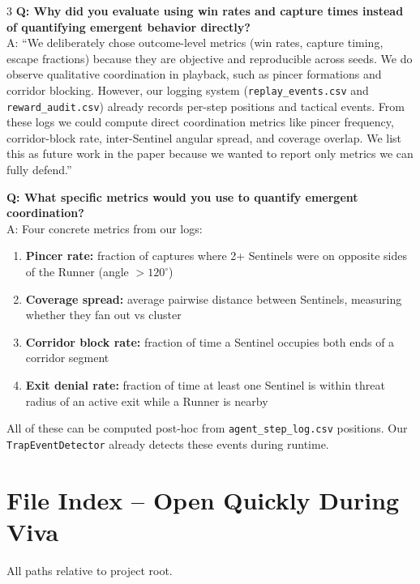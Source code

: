 \documentclass[10pt,landscape,a4paper]{article}
\begin{document}
\begin{multicols}{3}
\textbf{Q: Why did you evaluate using win rates and capture times instead of quantifying emergent behavior directly?} \\
A: ``We deliberately chose outcome-level metrics (win rates, capture timing, escape fractions) because they are objective and reproducible across seeds. We do observe qualitative coordination in playback, such as pincer formations and corridor blocking. However, our logging system (\texttt{replay\_events.csv} and \texttt{reward\_audit.csv}) already records per-step positions and tactical events. From these logs we could compute direct coordination metrics like pincer frequency, corridor-block rate, inter-Sentinel angular spread, and coverage overlap. We list this as future work in the paper because we wanted to report only metrics we can fully defend.''

\textbf{Q: What specific metrics would you use to quantify emergent coordination?} \\
A: Four concrete metrics from our logs:
\begin{enumerate}
\item \textbf{Pincer rate:} fraction of captures where 2+ Sentinels were on opposite sides of the Runner (angle $> 120^{\circ}$)
\item \textbf{Coverage spread:} average pairwise distance between Sentinels, measuring whether they fan out vs cluster
\item \textbf{Corridor block rate:} fraction of time a Sentinel occupies both ends of a corridor segment
\item \textbf{Exit denial rate:} fraction of time at least one Sentinel is within threat radius of an active exit while a Runner is nearby
\end{enumerate}
All of these can be computed post-hoc from \texttt{agent\_step\_log.csv} positions. Our \texttt{TrapEventDetector} already detects these events during runtime.

\section{File Index -- Open Quickly During Viva}

{\scriptsize All paths relative to project root.}


\end{multicols}
\end{document}
